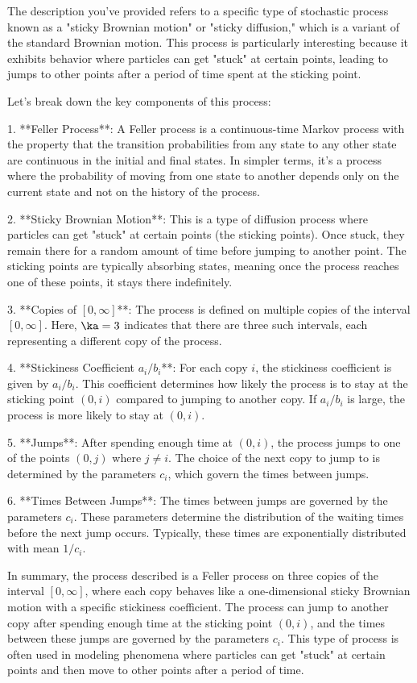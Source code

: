 The description you've provided refers to a specific type of stochastic process known as a "sticky Brownian motion" or "sticky diffusion," which is a variant of the standard Brownian motion. This process is particularly interesting because it exhibits behavior where particles can get "stuck" at certain points, leading to jumps to other points after a period of time spent at the sticking point.

Let's break down the key components of this process:

1. **Feller Process**: A Feller process is a continuous-time Markov process with the property that the transition probabilities from any state to any other state are continuous in the initial and final states. In simpler terms, it's a process where the probability of moving from one state to another depends only on the current state and not on the history of the process.

2. **Sticky Brownian Motion**: This is a type of diffusion process where particles can get "stuck" at certain points (the sticking points). Once stuck, they remain there for a random amount of time before jumping to another point. The sticking points are typically absorbing states, meaning once the process reaches one of these points, it stays there indefinitely.

3. **Copies of \([0, \infty]\)**: The process is defined on multiple copies of the interval \([0, \infty]\). Here, \(\ka = 3\) indicates that there are three such intervals, each representing a different copy of the process.

4. **Stickiness Coefficient \(a_i / b_i\)**: For each copy \(i\), the stickiness coefficient is given by \(a_i / b_i\). This coefficient determines how likely the process is to stay at the sticking point \((0, i)\) compared to jumping to another copy. If \(a_i / b_i\) is large, the process is more likely to stay at \((0, i)\).

5. **Jumps**: After spending enough time at \((0, i)\), the process jumps to one of the points \((0, j)\) where \(j \neq i\). The choice of the next copy to jump to is determined by the parameters \(c_i\), which govern the times between jumps.

6. **Times Between Jumps**: The times between jumps are governed by the parameters \(c_i\). These parameters determine the distribution of the waiting times before the next jump occurs. Typically, these times are exponentially distributed with mean \(1/c_i\).

In summary, the process described is a Feller process on three copies of the interval \([0, \infty]\), where each copy behaves like a one-dimensional sticky Brownian motion with a specific stickiness coefficient. The process can jump to another copy after spending enough time at the sticking point \((0, i)\), and the times between these jumps are governed by the parameters \(c_i\). This type of process is often used in modeling phenomena where particles can get "stuck" at certain points and then move to other points after a period of time.